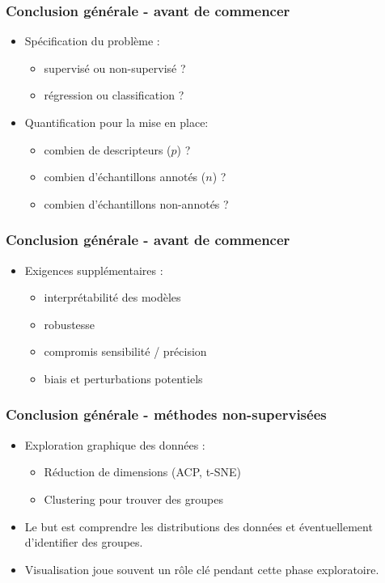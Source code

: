 \begin{frame}
\frametitle{Conclusion générale - avant de commencer}
\begin{itemize}
\item Spécification du problème : 
\begin{itemize}
	\item supervisé ou non-supervisé ? 
	\item régression ou classification ? 
\end{itemize}
\item Quantification pour la mise en place:
\begin{itemize}
	\item combien de descripteurs ($p$) ? 
	\item combien d'échantillons annotés ($n$) ? 
	\item combien d'échantillons non-annotés ?
\end{itemize}
\end{itemize}
\end{frame}

\begin{frame}
\frametitle{Conclusion générale - avant de commencer}
\begin{itemize}
	\item Exigences supplémentaires : 
	\begin{itemize}
		\item interprétabilité des modèles
		\item robustesse 
		\item compromis sensibilité / précision
		\item biais et perturbations potentiels
	\end{itemize}
\end{itemize}
\end{frame}

\begin{frame}
\frametitle{Conclusion générale - méthodes non-supervisées}
\begin{itemize}
	\item Exploration graphique des données : 
	\begin{itemize}
		\item Réduction de dimensions (ACP, t-SNE)
		\item Clustering pour trouver des groupes
	\end{itemize}
	\item Le but est comprendre les distributions des données et éventuellement d'identifier des groupes. 
	\item Visualisation joue souvent un rôle clé pendant cette phase exploratoire.
\end{itemize}
\end{frame}

